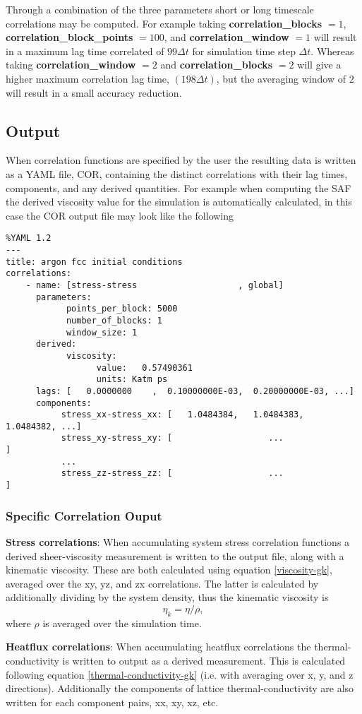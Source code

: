 Through a combination of the three parameters short or long timescale correlations may be computed. For example taking {\bf correlation\_blocks} $= 1$, {\bf correlation\_block\_points} $= 100$, and {\bf correlation\_window} $= 1$ will result in a maximum
lag time correlated of $99 \Delta t$ for simulation time step $\Delta t$. Whereas taking {\bf correlation\_window} $= 2$ and {\bf correlation\_blocks} $= 2$ will give a higher maximum correlation lag time, $(198 \Delta t)$, but the averaging window of $2$ will result in a small accuracy reduction. 

\subsection{Output}

When correlation functions are specified by the user the resulting data is written as a YAML file, COR, containing the distinct correlations with their lag times, components, and any derived quantities. For example when computing the SAF the derived viscosity value for the simulation is automatically calculated, in this case the COR output file may look like the following

\begin{verbatim}
%YAML 1.2
---
title: argon fcc initial conditions
correlations:
    - name: [stress-stress                    , global]
      parameters:
            points_per_block: 5000
            number_of_blocks: 1
            window_size: 1
      derived:
            viscosity:
                  value:   0.57490361    
                  units: Katm ps 
      lags: [   0.0000000    ,  0.10000000E-03,  0.20000000E-03, ...]
      components: 
           stress_xx-stress_xx: [   1.0484384,   1.0484383,   1.0484382, ...]
           stress_xy-stress_xy: [                   ...                     ]
           ...
           stress_zz-stress_zz: [                   ...                     ]
\end{verbatim}

\subsubsection{Specific Correlation Ouput}
\textbf{Stress correlations}: When accumulating system stress correlation functions a derived sheer-viscosity measurement is written to the output file, along with a kinematic viscosity. These are both calculated using equation \ref{viscosity-gk}, averaged over the xy, yz, and zx correlations. The latter is calculated by additionally dividing by the system density, thus the kinematic viscosity is 
\begin{equation}
    \eta_k = \eta / \rho,
\end{equation}
where $\rho$ is averaged over the simulation time.

\textbf{Heatflux correlations}: When accumulating heatflux correlations the thermal-conductivity is written to output as a derived measurement. This is calculated following equation \ref{thermal-conductivity-gk} (i.e. with averaging over x, y, and z directions). Additionally the components of lattice thermal-conductivity are also written for each component pairs, xx, xy, xz, etc.

